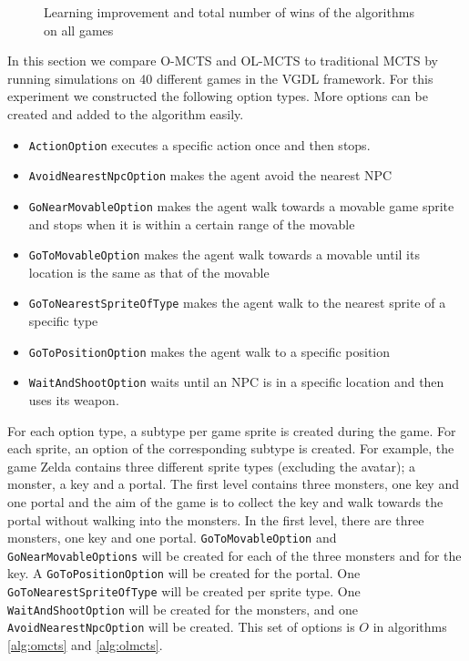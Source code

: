 \begin{figure}
{		\label{fig:total-results}
	}
	\caption{Learning improvement and total number of wins of the algorithms on
	all games}
\end{figure}

In this section we compare O-MCTS and OL-MCTS to traditional MCTS by running
simulations on 40 different games in the VGDL framework. For this experiment
we constructed the following option types. More options can be created and added
to the algorithm easily.

\begin{itemize}[noitemsep]
	\item \texttt{ActionOption} executes a specific action once and then
		stops.
	\item \texttt{AvoidNearestNpcOption} makes the agent avoid the nearest NPC
	\item \texttt{GoNearMovableOption} makes the agent walk towards a
		movable game sprite and stops when it is within a certain range of the
		movable
	\item \texttt{GoToMovableOption} makes the agent walk towards a
		movable until its location is the same as that of the movable
	\item \texttt{GoToNearestSpriteOfType} makes the agent walk to the nearest sprite of
		a specific type
	\item \texttt{GoToPositionOption} makes the agent walk to a specific position
	\item \texttt{WaitAndShootOption} waits until an NPC is in a specific location and
		then uses its weapon.
\end{itemize}

For each option type, a subtype per game sprite is created during the game. For
each sprite, an option of the corresponding subtype is created. For example, the
game Zelda contains three different sprite types (excluding the avatar); a
monster, a key and a portal. The first level contains three monsters, one key
and one portal and the aim of the game is to collect the key and walk towards
the portal without walking into the monsters. In the first level, there are
three monsters, one key and one portal. \texttt{GoToMovableOption} and
\texttt{GoNearMovableOptions} will be created for each of the three monsters and
for the key. A \texttt{GoToPositionOption} will be created for the portal.
One \texttt{GoToNearestSpriteOfType} will be created per sprite type. One
\texttt{WaitAndShootOption} will be created for the monsters, and one
\texttt{AvoidNearestNpcOption} will be
created. This set of options is $O$ in algorithms \ref{alg:omcts} and
\ref{alg:olmcts}.

